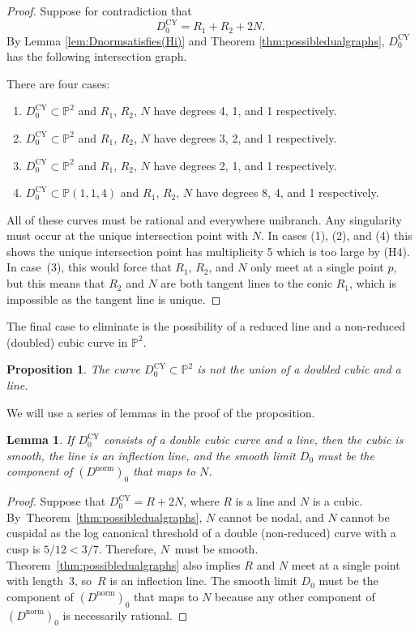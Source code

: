 \documentclass[JEP,XML,SOM,Unicode,NoFloatCountersInSection,published]{cedram}
\theoremstyle{plain}
\newtheorem{lemma}[theorem]{Lemma}
\newtheorem{proposition}[theorem]{Proposition}
\theoremstyle{definition}
\newcommand\PP{{\mathbb{P}}}
\newcommand\Dcyo{{D^{\mathrm{CY}}_0}}
\newcommand\Dnorm{{D^{\mathrm{norm}}}}
\newcommand\Dnormo{{(\Dnorm)_0}}
\begin{document}
\begin{proof}
Suppose for contradiction that
\[
\Dcyo=R_1+R_2+2N.
\]
By Lemma \ref{lem:Dnormsatisfies(Hi)} and Theorem \ref{thm:possibledualgraphs}, $\Dcyo$ has the following intersection graph.

\begin{figure}[htb]
\centering
\scalebox{1.3}{}
\end{figure}
There are four cases:
\begin{enumerate}
\item $\Dcyo\subset \PP^2$ and $R_1$, $R_2$, $N$ have degrees 4, 1, and 1 respectively.
\item $\Dcyo\subset \PP^2$ and $R_1$, $R_2$, $N$ have degrees 3, 2, and 1 respectively.
\item $\Dcyo\subset \PP^2$ and $R_1$, $R_2$, $N$ have degrees 2, 1, and 1 respectively.
\item $\Dcyo\subset \PP(1,1,4)$ and $R_1$, $R_2$, $N$ have degrees 8, 4, and 1 respectively.
\end{enumerate}
All of these curves must be rational and everywhere unibranch. Any singularity must occur at the unique intersection point with $N$. In cases (1), (2), and (4) this shows the unique intersection point has multiplicity 5 which is too large by (H4). In case~(3), this would force that $R_1$, $R_2$, and $N$ only meet at a single point $p$, but this means that $R_2$ and $N$ are both tangent lines to the conic $R_1$, which is impossible as the tangent line is unique.
\end{proof}

The final case to eliminate is the possibility of a reduced line and a non-reduced (doubled) cubic curve in $\PP^2$.

\begin{proposition}\label{prop:worstdeg7curve}
The curve $\Dcyo\subset \PP^2$ is not the union of a doubled cubic and a line.
\end{proposition}

We will use a series of lemmas in the proof of the proposition.

\begin{lemma}
If $\Dcyo$ consists of a double cubic curve and a line, then the cubic is smooth, the line is an inflection line, and the smooth limit $D_0$ must be the component of $\Dnormo$ that maps to $N$.
\end{lemma}

\begin{proof}
Suppose that $\Dcyo = R + 2N$, where $R$ is a line and $N$ is a cubic. By~Theorem~\ref{thm:possibledualgraphs}, $N$ cannot be nodal, and $N$ cannot be cuspidal as the log canonical threshold of a double (non-reduced) curve with a cusp is $5/12<3/7$. Therefore, $N$~must be smooth. Theorem~\ref{thm:possibledualgraphs} also implies $R$ and $N$ meet at a single point with length~3, so~$R$ is an inflection line. The smooth limit $D_0$ must be the component of $\Dnormo$ that maps to $N$ because any other component of $\Dnormo$ is necessarily rational.
\end{proof}
\end{document}
